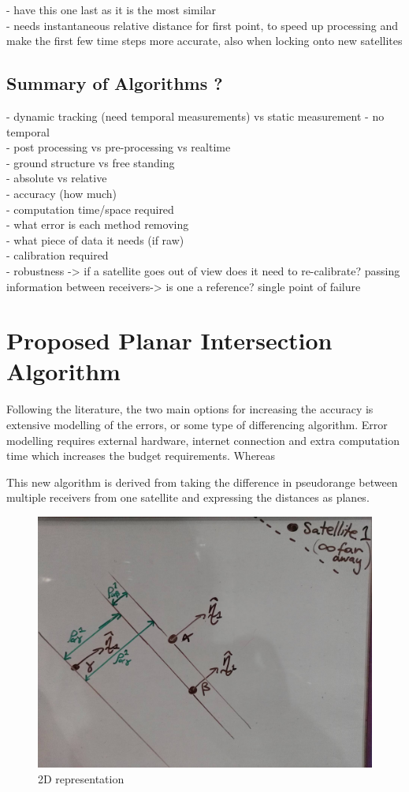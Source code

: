- have this one last as it is the most similar\\
- needs instantaneous relative distance for first point, to speed up processing and make the first few time steps more accurate, also when locking onto new satellites


\subsection{Summary of Algorithms ?}

- dynamic tracking (need temporal measurements) vs static measurement - no temporal\\
- post processing vs pre-processing vs realtime\\
- ground structure vs free standing\\
- absolute vs relative\\
- accuracy (how much)\\
- computation time/space required\\
- what error is each method removing\\
- what piece of data it needs (if raw)\\
- calibration required\\
- robustness -> if a satellite goes out of view does it need to re-calibrate? passing information between receivers-> is one a reference? single point of failure



\section{Proposed Planar Intersection Algorithm}
Following the literature, the two main options for increasing the accuracy is extensive modelling of the errors, or some type of differencing algorithm. Error modelling requires external hardware, internet connection and extra computation time which increases the budget requirements. Whereas 



This new algorithm is derived from taking the difference in pseudorange between multiple receivers from one satellite and expressing the distances as planes.
\begin{figure}[h]
\centering
\caption{2D representation}
\label{fig:overall_singleS_multiR}
\includegraphics[width=0.7\linewidth]{ChapterLiteratureReview/overall_singleS_multiR.jpg}
\end{figure}

